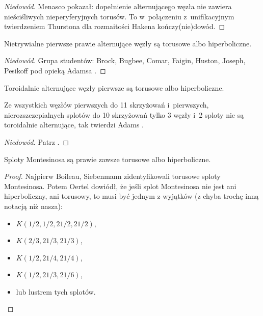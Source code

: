 \begin{proof}[Niedowód]
    Menasco \cite{menasco1984} pokazał: dopełnienie alternującego węzła nie zawiera nieściśliwych nieperyferyjnych torusów.
%
    To w~połączeniu z~unifikacyjnym twierdzeniem Thurstona dla rozmaitości Hakena kończy(nie)dowód.
%
\end{proof}

\begin{proposition}
    Nietrywialne pierwsze prawie alternujące węzły są torusowe albo hiperboliczne.
%
%
\end{proposition}

\begin{proof}[Niedowód]
    Grupa studentów: Brock, Bugbee, Comar, Faigin, Huston, Joseph, Pesikoff pod opieką Adamsa \cite{brock1992}.
%
%
%
%
%
%
%
%
\end{proof}

\begin{proposition}
    Toroidalnie alternujące węzły pierwsze są torusowe albo hiperboliczne.
\end{proposition}

Ze wszystkich węzłów pierwszych do 11 skrzyżowań i~pierwszych, nierozszczepialnych splotów do 10 skrzyżowań tylko 3 węzły i~2 sploty nie są toroidalnie alternujące, tak twierdzi Adams \cite{adams2005}.

\begin{proof}[Niedowód]
    Patrz \cite{adamsc1994}.
\end{proof}

\begin{proposition}
%
    Sploty Montesinosa są prawie zawsze torusowe albo hiperboliczne.
\end{proposition}

\begin{proof}
    Najpierw Boileau, Siebenmann \cite{boileau1980} zidentyfikowali torusowe sploty Montesinosa.
    Potem Oertel \cite{oertel1984} dowiódł, że jeśli splot Montesinosa nie jest ani hiperboliczny, ani torusowy, to musi być jednym z wyjątków (z chyba trochę inną notacją niż nasza):
    \begin{itemize}
        \item $K(1/2, 1/2, 21/2, 21/2)$,
        \item $K(2/3, 21/3, 21/3)$,
        \item $K(1/2, 21/4, 21/4)$,
        \item $K(1/2, 21/3, 21/6)$,
        \item lub lustrem tych splotów. \qedhere
    \end{itemize}
\end{proof}

